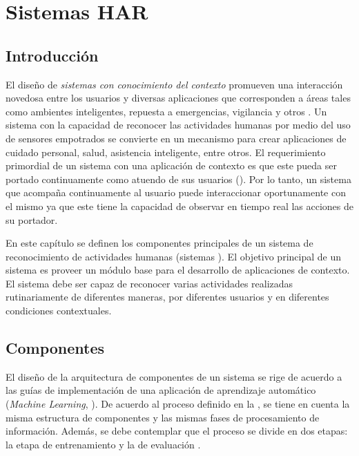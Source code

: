 
\chapter{Sistemas HAR }

\label{chap4:sistemas-de-reconocimiento}

\section{Introducción}

\label{sec41:introduccion}El diseño de \emph{sistemas con conocimiento
del contexto} promueven una interacción novedosa entre los usuarios
y diversas aplicaciones que corresponden a áreas tales como ambientes
inteligentes, repuesta a emergencias, vigilancia y otros \cite{Choudhury2008}.
Un sistema con la capacidad de reconocer las actividades humanas por
medio del uso de sensores empotrados se convierte en un mecanismo
para crear aplicaciones de cuidado personal, salud, asistencia inteligente,
entre otros. El requerimiento primordial de un sistema con una aplicación
de contexto es que este pueda ser portado continuamente como atuendo
de sus usuarios (). Por lo tanto, un sistema que
acompaña continuamente al usuario puede interaccionar oportunamente
con el mismo ya que este tiene la capacidad de observar en tiempo
real las acciones de su portador. 

En este capítulo se definen los componentes principales de un sistema
de reconocimiento de actividades humanas (sistemas ). El
objetivo principal de un sistema  es proveer un módulo
base para el desarrollo de aplicaciones de contexto. El sistema debe
ser capaz de reconocer varias actividades realizadas rutinariamente
de diferentes maneras, por diferentes usuarios y en diferentes condiciones
contextuales. 

\section{Componentes}

\label{sec42:componentes}El diseño de la arquitectura de componentes
de un sistema  se rige de acuerdo a las guías de implementación
de una aplicación de aprendizaje automático (\emph{Machine Learning},
). De acuerdo al proceso definido en la ,
se tiene en cuenta la misma estructura de componentes y las mismas
fases de procesamiento de información. Además, se debe contemplar
que el proceso se divide en dos etapas: la etapa de entrenamiento
y la de evaluación \cite{LaraLabrador2013}. 

